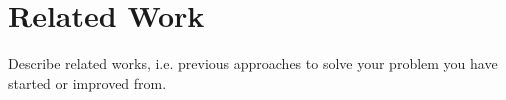 \section{Related Work}
\label{sec:related}

Describe related works, i.e. previous approaches to solve your problem you have started or improved from.
